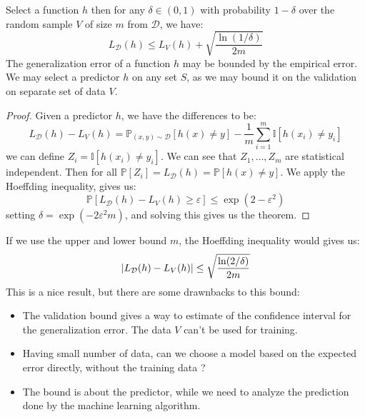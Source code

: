 \begin{theorem}
    Select a function $h$ then for any $\delta\in(0, 1)$ with probability $1-\delta$ over the random sample $V$ of size $m$ from $\mathcal{D}$, we have:
    \begin{equation*}
        L_\mathcal{D}(h) \le L_V(h)+\sqrt{\frac{\ln(1/\delta)}{2m}}
    \end{equation*}
    The generalization error of a function $h$ may be bounded by the empirical error. We may select a predictor $h$ on any set $S$, as we may bound it on the validation on separate set of data $V$.
\end{theorem}
\begin{proof}
    Given a predictor $h$, we have the differences to be:
    \begin{equation*}
        L_\mathcal{D}(h) - L_V(h) = \mathbb{P}_{(x, y)\sim\mathcal{D}}[h(x)\ne y] - \frac{1}{m}\sum^m_{i=1}\mathbb{I}[h(x_i)\ne y_i]
    \end{equation*}
    we can define $Z_i = \mathbb{I}[h(x_i)\ne y_i]$. We can see that $Z_1,\dots,Z_m$ are statistical independent. Then for all $\mathbb{P}[Z_i] = L_\mathcal{D}(h) = \mathbb{P}[h(x)\ne y]$. We apply the Hoeffding inequality, gives us:
    \begin{equation*}
        \mathbb{P}[L_\mathcal{D}(h) - L_V(h)\ge\varepsilon]\le\exp(2-\varepsilon^2)
    \end{equation*}
    setting $\delta = \exp(-2\varepsilon^2m)$, and solving this gives us the theorem. 
\end{proof}

\begin{remark}
    If we use the upper and lower bound $m$, the Hoeffding inequality would gives us:
    \begin{equation*}
        \left| L_\mathcal{D}(h) - L_V(h) \right| \le \sqrt{\frac{\ln(2/\delta)}{2m}}
    \end{equation*}
    This is a nice result, but there are some drawnbacks to this bound:
    \begin{itemize}
        \item The validation bound gives a way to estimate of the confidence interval for the generalization error. The data $V$ can't be used for training. 
        \item Having small number of data, can we choose a model based on the expected error directly, without the training data ?
        \item The bound is about the predictor, while we need to analyze the prediction done by the machine learning algorithm. 
    \end{itemize}
\end{remark}

